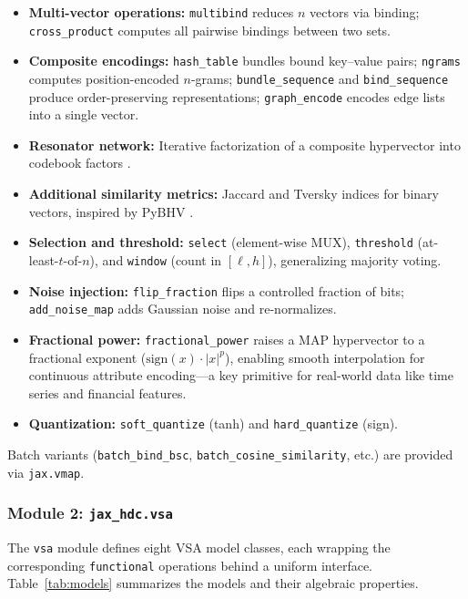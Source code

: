 \documentclass[twoside,11pt]{article}
\begin{document}
\begin{itemize}
\item \textbf{Multi-vector operations:} \texttt{multibind} reduces $n$ vectors via binding; \texttt{cross\_product} computes all pairwise bindings between two sets.
\item \textbf{Composite encodings:} \texttt{hash\_table} bundles bound key--value pairs; \texttt{ngrams} computes position-encoded $n$-grams; \texttt{bundle\_sequence} and \texttt{bind\_sequence} produce order-preserving representations; \texttt{graph\_encode} encodes edge lists into a single vector.
\item \textbf{Resonator network:} Iterative factorization of a composite hypervector into codebook factors \citep{frady2020resonator}.
\item \textbf{Additional similarity metrics:} Jaccard and Tversky indices for binary vectors, inspired by PyBHV \citep{vandervorst2023pybhv}.
\item \textbf{Selection and threshold:} \texttt{select} (element-wise MUX), \texttt{threshold} (at-least-$t$-of-$n$), and \texttt{window} (count in $[\ell, h]$), generalizing majority voting.
\item \textbf{Noise injection:} \texttt{flip\_fraction} flips a controlled fraction of bits; \texttt{add\_noise\_map} adds Gaussian noise and re-normalizes.
\item \textbf{Fractional power:} \texttt{fractional\_power} raises a MAP hypervector to a fractional exponent ($\text{sign}(x) \cdot |x|^p$), enabling smooth interpolation for continuous attribute encoding---a key primitive for real-world data like time series and financial features.
\item \textbf{Quantization:} \texttt{soft\_quantize} (tanh) and \texttt{hard\_quantize} (sign).
\end{itemize}

Batch variants (\texttt{batch\_bind\_bsc}, \texttt{batch\_cosine\_similarity}, etc.) are provided via \texttt{jax.vmap}.

\subsubsection{Module 2: \texttt{jax\_hdc.vsa}}

The \texttt{vsa} module defines eight VSA model classes, each wrapping the corresponding \texttt{functional} operations behind a uniform interface. Table~\ref{tab:models} summarizes the models and their algebraic properties.
\end{document}
